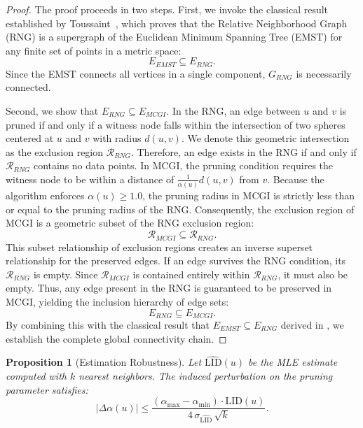 \documentclass{article}
\theoremstyle{plain}
\newtheorem{proposition}[theorem]{Proposition}
\theoremstyle{definition}
\theoremstyle{remark}
\newcommand{\ours}{MCGI\xspace}
\begin{document}
\begin{proof}
The proof proceeds in two steps. First, we invoke the classical result established by Toussaint~\cite{TOUSSAINT1980261}, which proves that the Relative Neighborhood Graph (RNG) is a supergraph of the Euclidean Minimum Spanning Tree (EMST) for any finite set of points in a metric space:
\begin{equation}
    E_{EMST} \subseteq E_{RNG}.
\end{equation}
Since the EMST connects all vertices in a single component, $G_{RNG}$ is necessarily connected.

Second, we show that $E_{RNG} \subseteq E_{MCGI}$. In the RNG, an edge between $u$ and $v$ is pruned if and only if a witness node falls within the intersection of two spheres centered at $u$ and $v$ with radius $d(u, v)$. We denote this geometric intersection as the exclusion region $\mathcal{R}_{RNG}$. Therefore, an edge exists in the RNG if and only if $\mathcal{R}_{RNG}$ contains no data points.
In \ours{}, the pruning condition requires the witness node to be within a distance of $\frac{1}{\alpha(u)} d(u, v)$ from $v$. Because the algorithm enforces $\alpha(u) \ge 1.0$, the pruning radius in \ours{} is strictly less than or equal to the pruning radius of the RNG. Consequently, the exclusion region of \ours{} is a geometric subset of the RNG exclusion region:
\begin{equation}
    \mathcal{R}_{MCGI} \subseteq \mathcal{R}_{RNG}.
\end{equation}
This subset relationship of exclusion regions creates an inverse superset relationship for the preserved edges. If an edge survives the RNG condition, its $\mathcal{R}_{RNG}$ is empty. Since $\mathcal{R}_{MCGI}$ is contained entirely within $\mathcal{R}_{RNG}$, it must also be empty. Thus, any edge present in the RNG is guaranteed to be preserved in \ours{}, yielding the inclusion hierarchy of edge sets:
\begin{equation}
    E_{RNG} \subseteq E_{MCGI}.
\end{equation}
By combining this with the classical result that $E_{EMST} \subseteq E_{RNG}$ derived in \cite{TOUSSAINT1980261}, we establish the complete global connectivity chain.
\end{proof}

\begin{proposition}[Estimation Robustness]
\label{proof:robustness}
Let $\widehat{\mathrm{LID}}(u)$ be the MLE estimate computed with
$k$ nearest neighbors. The induced perturbation on the pruning
parameter satisfies:
\begin{equation}
    |\Delta\alpha(u)| \leq
    \frac{(\alpha_{\max} - \alpha_{\min}) \cdot \mathrm{LID}(u)}
         {4\,\sigma_{\widehat{\mathrm{LID}}}\,\sqrt{k}}.
\end{equation}
\end{proposition}
\end{document}
